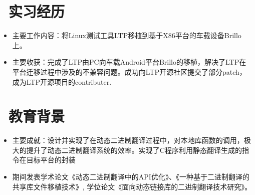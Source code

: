 \documentclass{resume}
\begin{document}

\section{\faUsers\ 实习经历}\normalsize
{}
\begin{itemize}
  \item {主要工作内容：将Linux测试工具LTP移植到基于X86平台的车载设备Brillo上。}
    \item {主要收获：完成了LTP由PC向车载Android平台Brillo的移植，解决了LTP在平台迁移过程中涉及的不兼容问题。成功向LTP开源社区提交了部分patch，成为LTP开源项目的contributer.}
\end{itemize}

\section{\faGraduationCap\  教育背景}\normalsize
{}
\begin{itemize}
\item {主要成就：设计并实现了在动态二进制翻译过程中，对本地库函数的调用，极大的提升了动态二进制翻译系统的效率。实现了C程序利用静态翻译生成的指令在目标平台的封装}
  \item {期间发表学术论文《动态二进制翻译中的API优化》、《一种基于二进制翻译的共享库文件移植技术》, 学位论文《面向动态链接库的二进制翻译技术研究》。}
\end{itemize}

\end{document}
